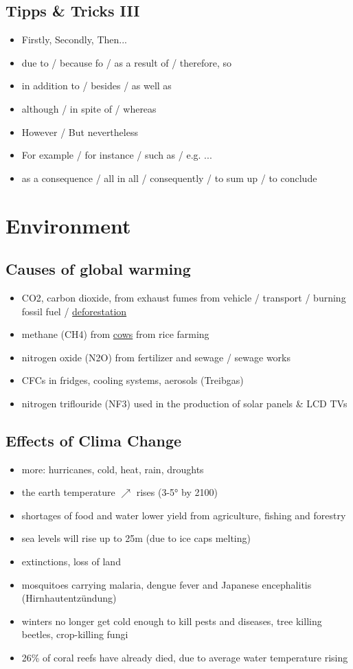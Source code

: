 \documentclass[a5paper,12pt,twoside,titlepage]{scrartcl}
\begin{document}
\subsection{Tipps \& Tricks III}
		\begin{itemize}
			\item Firstly, Secondly, Then...
			\item due to / because fo / as a result of / therefore, so
			\item in addition to / besides / as well as
			\item although / in spite of / whereas
			\item However / But nevertheless
			\item For example / for instance / such as / e.g. ...
			\item as a consequence / all in all / consequently / to sum up / to conclude
		\end{itemize}
\newpage

\section{Environment}
\subsection{Causes of global warming}
		\begin{itemize}
		\item CO2, carbon dioxide, from exhaust fumes from vehicle / transport / burning fossil fuel / \underline{deforestation}
		\item methane (CH4) from \underline{cows} from rice farming
		\item nitrogen oxide (N2O) from fertilizer and sewage / sewage works
		\item CFCs in fridges, cooling systems, aerosols (Treibgas) 
		\item nitrogen triflouride (NF3) used in the production of solar panels \& LCD TVs
		\end{itemize}
\subsection{Effects of Clima Change}
			\begin{itemize}
			\item more: hurricanes, cold, heat, rain, droughts
			\item the earth temperature $\nearrow$ rises (3-5° by 2100)
			\item shortages of food and water \textrightarrow lower yield from agriculture, fishing and forestry
			\item sea levels will rise up to 25m (due to ice caps melting)
			\item extinctions, loss of land
			\item mosquitoes carrying malaria, dengue fever and Japanese encephalitis (Hirnhautentzündung)
			\item winters no longer get cold enough to kill pests and diseases, tree killing beetles, crop-killing fungi
			\item 26\% of coral reefs have already died, due to average water temperature rising
			\end{itemize}
\end{document}
